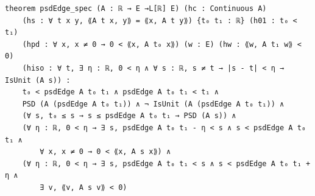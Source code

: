 \begin{theorem}[bp-110]
\begin{verbatim}
theorem psdEdge_spec (A : ℝ → E →L[ℝ] E) (hc : Continuous A)
    (hs : ∀ t x y, ⟪A t x, y⟫ = ⟪x, A t y⟫) {t₀ t₁ : ℝ} (h01 : t₀ < t₁)
    (hpd : ∀ x, x ≠ 0 → 0 < ⟪x, A t₀ x⟫) (w : E) (hw : ⟪w, A t₁ w⟫ < 0)
    (hiso : ∀ t, ∃ η : ℝ, 0 < η ∧ ∀ s : ℝ, s ≠ t → |s - t| < η → IsUnit (A s)) :
    t₀ < psdEdge A t₀ t₁ ∧ psdEdge A t₀ t₁ < t₁ ∧
    PSD (A (psdEdge A t₀ t₁)) ∧ ¬ IsUnit (A (psdEdge A t₀ t₁)) ∧
    (∀ s, t₀ ≤ s → s ≤ psdEdge A t₀ t₁ → PSD (A s)) ∧
    (∀ η : ℝ, 0 < η → ∃ s, psdEdge A t₀ t₁ - η < s ∧ s < psdEdge A t₀ t₁ ∧
        ∀ x, x ≠ 0 → 0 < ⟪x, A s x⟫) ∧
    (∀ η : ℝ, 0 < η → ∃ s, psdEdge A t₀ t₁ < s ∧ s < psdEdge A t₀ t₁ + η ∧
        ∃ v, ⟪v, A s v⟫ < 0)
\end{verbatim}
\end{theorem}

